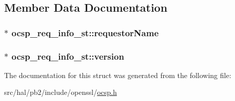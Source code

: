 \subsection{Member Data Documentation}
\subsubsection[{\texorpdfstring{requestor\+Name}{requestorName}}]{$\ast$ ocsp\+\_\+req\+\_\+info\+\_\+st\+::requestor\+Name}\hypertarget{structocsp__req__info__st_a6fd6c3850e1765a3e9a78b89c6d32f22}{}\label{structocsp__req__info__st_a6fd6c3850e1765a3e9a78b89c6d32f22}
\subsubsection[{\texorpdfstring{version}{version}}]{$\ast$ ocsp\+\_\+req\+\_\+info\+\_\+st\+::version}\hypertarget{structocsp__req__info__st_a945a047ebca6883967b717d6d39a5411}{}\label{structocsp__req__info__st_a945a047ebca6883967b717d6d39a5411}


The documentation for this struct was generated from the following file\+:\begin{DoxyCompactItemize}
\item 
src/hal/pb2/include/openssl/\hyperlink{ocsp_8h}{ocsp.\+h}\end{DoxyCompactItemize}
